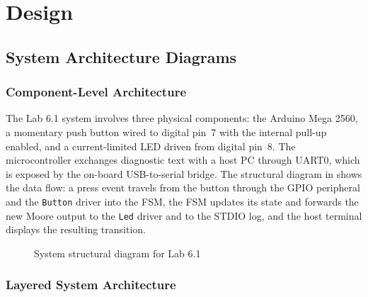 \section{Design}

\subsection{System Architecture Diagrams}

\subsubsection{Component-Level Architecture}

The Lab 6.1 system involves three physical components: the Arduino Mega 2560, a momentary push button wired to digital pin~7 with the internal pull-up enabled, and a current-limited LED driven from digital pin~8. The microcontroller exchanges diagnostic text with a host PC through UART0, which is exposed by the on-board USB-to-serial bridge. The structural diagram in  shows the data flow: a press event travels from the button through the GPIO peripheral and the \texttt{Button} driver into the FSM, the FSM updates its state and forwards the new Moore output to the \texttt{Led} driver and to the STDIO log, and the host terminal displays the resulting transition.

\begin{figure}[H]
\centering
{}
\caption{System structural diagram for Lab 6.1}
\label{fig:system_structural_diagram}
\end{figure}

\subsubsection{Layered System Architecture}

